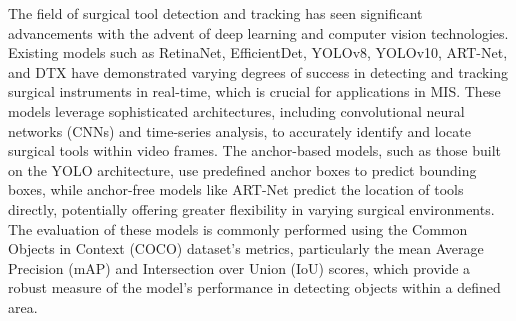 The field of surgical tool detection and tracking has seen significant advancements with the advent of deep learning and computer vision technologies. Existing models such as RetinaNet, EfficientDet, YOLOv8, YOLOv10, ART-Net, and DTX have demonstrated varying degrees of success in detecting and tracking surgical instruments in real-time, which is crucial for applications in MIS. These models leverage sophisticated architectures, including convolutional neural networks (CNNs) and time-series analysis, to accurately identify and locate surgical tools within video frames. The anchor-based models, such as those built on the YOLO architecture, use predefined anchor boxes to predict bounding boxes, while anchor-free models like ART-Net predict the location of tools directly, potentially offering greater flexibility in varying surgical environments. The evaluation of these models is commonly performed using the Common Objects in Context (COCO) dataset's metrics, particularly the mean Average Precision (mAP) and Intersection over Union (IoU) scores, which provide a robust measure of the model's performance in detecting objects within a defined area. 

